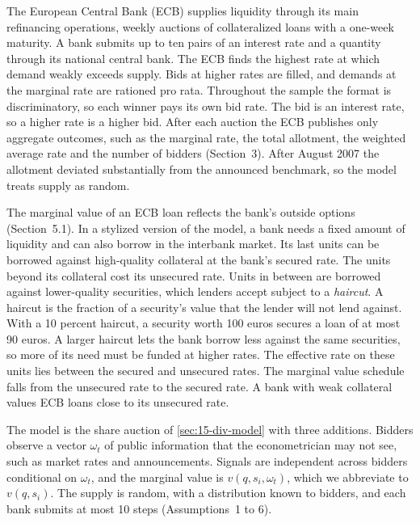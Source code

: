  The European Central Bank (ECB) supplies liquidity through its main refinancing
operations, weekly auctions of collateralized loans with a one-week maturity. A bank submits up to ten pairs
of an interest rate and a quantity through its national central bank. The ECB finds the highest rate at which
demand weakly exceeds supply. Bids at higher rates are filled, and demands at the marginal rate are rationed
pro rata. Throughout the sample the format is discriminatory, so each winner pays its own bid rate. The bid is
an interest rate, so a higher rate is a higher bid. After each auction the ECB publishes only aggregate
outcomes, such as the marginal rate, the total allotment, the weighted average rate and the number of bidders
(Section~3). After August 2007 the allotment deviated substantially from the announced benchmark, so the model
treats supply as random.

 The marginal value of an ECB loan reflects the bank's outside options (Section~5.1). In a
stylized version of the model, a bank needs a fixed amount of liquidity and can also borrow in the interbank
market. Its last units can be borrowed against high-quality collateral at the bank's secured rate. The units
beyond its collateral cost its unsecured rate. Units in between are borrowed against lower-quality
securities, which lenders accept subject to a \emph{haircut}. A haircut is the fraction of a security's
value that the lender will not lend against. With a 10 percent haircut, a security worth 100 euros secures
a loan of at most 90 euros. A larger haircut lets the bank borrow less against the same securities, so
more of its need must be funded at higher rates. The effective rate
on these units lies between the secured and unsecured rates. The marginal value schedule falls
from the unsecured rate to the secured rate. A bank with weak collateral values ECB loans close to its
unsecured rate.

 The model is the share auction of \cref{sec:15-div-model} with three additions. Bidders
observe a vector $\omega_t$ of public information that the econometrician may not see, such as market rates
and announcements. Signals are independent across bidders conditional on $\omega_t$, and the marginal value
is $v(q,s_i,\omega_t)$, which we abbreviate to $v(q,s_i)$. The supply is random, with a distribution known to
bidders, and each bank submits at most 10 steps (Assumptions~1 to 6).

